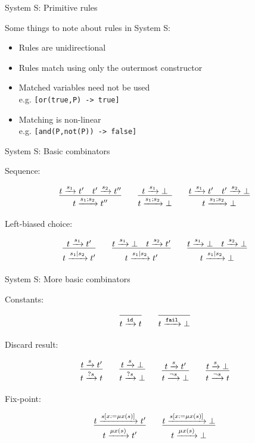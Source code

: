 \documentclass{beamer}
\newcommand{\arr}[1]{\ensuremath\xrightarrow{#1}}
\begin{document}
\begin{frame}{System S: Primitive rules}

Some things to note about rules in System S:

\begin{itemize}
  \item Rules are unidirectional
  \item Rules match using only the outermost constructor
  \item Matched variables need not be used\\
        e.g. \texttt{[or(true,P) -> true]}
  \item Matching is non-linear\\
        e.g. \texttt{[and(P,not(P)) -> false]}
\end{itemize}

\end{frame}


\begin{frame}{System S: Basic combinators}

Sequence:

\[
\infer{t \arr{s_1;s_2} t''}{t \arr{s_1} t' \quad t' \arr{s_2} t''}
\qquad 
\infer{t \arr{s_1;s_2} \bot}{t \arr{s_1} \bot}
\qquad
\infer{t \arr{s_1;s_2} \bot}{t \arr{s_1} t' \quad t' \arr{s_2} \bot}
\]

Left-biased choice:

\[
\infer{t \arr{s_1|s_2} t'}{t \arr{s_1} t'}
\qquad 
\infer{t \arr{s_1|s_2} t'}{t \arr{s_1} \bot \quad t \arr{s_2} t'}
\qquad
\infer{t \arr{s_1|s_2} \bot}{t \arr{s_1} \bot \quad t \arr{s_2} \bot}
\]

\end{frame}


\begin{frame}{System S: More basic combinators}

Constants:

\[
\infer{t \arr{\mathtt{id}} t}{}
\qquad
\infer{t \arr{\mathtt{fail}} \bot}{}
\]

Discard result:

\[
\infer{t \arr{?s} t}{t \arr{s} t'}
\qquad 
\infer{t \arr{?s} \bot}{t \arr{s} \bot}
\qquad
\infer{t \arr{\lnot s} \bot}{t \arr{s} t'}
\qquad 
\infer{t \arr{\lnot s} t}{t \arr{s} \bot}
\]

Fix-point:

\[
\infer{t \arr{\mu x(s)} t'}{t \arr{s[x := \mu x(s)]} t'}
\qquad 
\infer{t \arr{\mu x(s)} \bot}{t \arr{s[x := \mu x(s)]} \bot}
\]

\end{frame}
\end{document}
